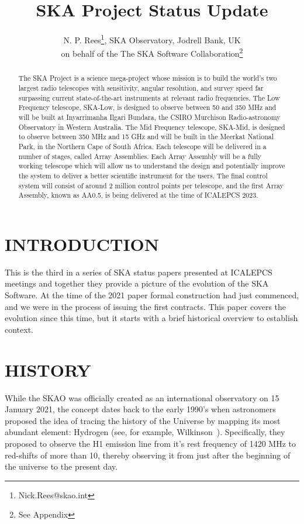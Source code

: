 \documentclass[a4paper,
               biblatex,     %
               keeplastbox,   %
               ]{jacow}
\begin{document}
\title{SKA Project Status Update}

\author{N. P. Rees\thanks{Nick.Rees@skao.int}, SKA Observatory, Jodrell Bank, UK\\
		on behalf of the The SKA Software Collaboration\thanks{See Appendix}}


\maketitle

%
\begin{abstract}
The SKA Project is a science mega-project whose mission is to build the world's two largest radio telescopes with sensitivity, angular resolution, and survey speed far surpassing current state-of-the-art instruments at relevant radio frequencies. The Low Frequency telescope, SKA-Low, is designed to observe between 50 and 350 MHz and will be built at Inyarrimanha Ilgari Bundara, the CSIRO Murchison Radio-astronomy Observatory in Western Australia. The Mid Frequency telescope, SKA-Mid, is designed to observe between 350 MHz and 15 GHz and will be built in the Meerkat National Park, in the Northern Cape of South Africa. Each telescope will be delivered in a number of stages, called Array Assemblies. Each Array Assembly will be a fully working telescope which will allow us to understand the design and potentially improve the system to deliver a better scientific instrument for the users. The final control system will consist of around 2 million control points per telescope, and the first Array Assembly, known as AA0.5, is being delivered at the time of ICALEPCS 2023.
\end{abstract}

\section{INTRODUCTION}
This is the third in a series of SKA status papers presented at ICALEPCS meetings and together they provide a picture of the evolution of the SKA Software. At the time of the 2021 paper formal construction had just commenced, and we were in the process of issuing the first contracts. This paper covers the evolution since this time, but it starts with a brief historical overview to establish context.

\section{HISTORY}
While the SKAO was officially created as an international observatory on 15 January 2021, the concept dates back to the early 1990's when astronomers proposed the idea of tracing the history of the Universe by mapping its most abundant element: Hydrogen (see, for example, Wilkinson~\cite{1991ASPC...19..428W}). Specifically, they proposed to observe the H1 emission line from it's rest frequency of 1420 MHz to red-shifts of more than 10, thereby observing it from just after the beginning of the universe to the present day.
\end{document}
